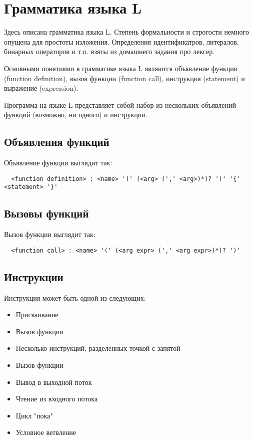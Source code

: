 \documentclass{amsart}
\begin{document}
  \section{Грамматика языка L}

  Здесь описана грамматика языка L. Степень формальности и строгости немного опущена для простоты изложения.
  Определения идентификатров, литералов, бинарных операторов и т.п. взяты из домашнего задания про лексер.

  Основными понятиями в грамматике языка L являются объявление функции (function definition), вызов функции (function 
  call), инструкция (statement) и выражение (expression).

  Программа на языке L представляет собой набор из нескольких объявлений функций (возможно, ни одного) и инструкции.
    
  \subsection{Объявления функций}
  Объявление функции выглядит так:

  \begin{lstlisting}
  <function definition> : <name> '(' (<arg> (',' <arg>)*)? ')' '{' <statement> '}'
  \end{lstlisting}

  \subsection{Вызовы функций}
  Вызов функции выглядит так:

  \begin{lstlisting}
  <function call> : <name> '(' (<arg expr> (',' <arg expr>)*)? ')'
  \end{lstlisting}


  \subsection{Инструкции}
  Инструкция может быть одной из следующих:

  \begin{itemize}
      \item Присваивание
      \item Вызов функции
      \item Несколько инструкций, разделенных точкой с запятой
      \item Вызов функции
      \item Вывод в выходной поток
      \item Чтение из входного потока
      \item Цикл "пока"
      \item Условное ветвление
  \end{itemize}
\end{document}
